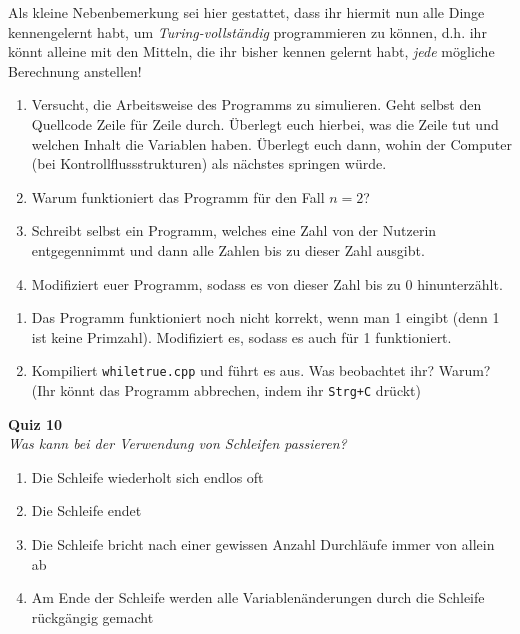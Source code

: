 Als kleine Nebenbemerkung sei hier gestattet, dass ihr hiermit nun alle Dinge
kennengelernt habt, um \emph{Turing-vollständig} programmieren zu können, d.h.
ihr könnt alleine mit den Mitteln, die ihr bisher kennen gelernt habt,
\emph{jede} mögliche Berechnung anstellen!

\begin{praxis}
      \begin{enumerate}
            \item Versucht, die Arbeitsweise des Programms zu simulieren. Geht selbst
                  den Quellcode Zeile für Zeile durch. Überlegt euch hierbei, was die Zeile tut
                  und welchen Inhalt die Variablen haben. Überlegt euch dann, wohin der
                  Computer (bei Kontrollflussstrukturen) als nächstes springen würde.
            \item Warum funktioniert das Programm für den Fall $n = 2$?
            \item Schreibt selbst ein Programm, welches eine Zahl von der Nutzerin
                  entgegennimmt und dann alle Zahlen bis zu dieser Zahl ausgibt.
            \item Modifiziert euer Programm, sodass es von dieser Zahl bis zu 0
                  hinunterzählt.
      \end{enumerate}
\end{praxis}

\begin{spiel}
      \begin{enumerate}
            \item Das Programm funktioniert noch nicht korrekt, wenn man 1 eingibt
                  (denn 1 ist keine Primzahl). Modifiziert es, sodass es auch für 1
                  funktioniert.
            \item Kompiliert \texttt{whiletrue.cpp} und führt es aus. Was beobachtet
                  ihr? Warum? (Ihr könnt das Programm abbrechen, indem ihr
                  \texttt{Strg+C} drückt)
      \end{enumerate}
      

\end{spiel}

\textbf{Quiz 10}\\
\textit{Was kann bei der Verwendung von Schleifen passieren?}
\begin{enumerate}[label=\alph*)]
    \item Die Schleife wiederholt sich endlos oft
    \item Die Schleife endet
    \item Die Schleife bricht nach einer gewissen Anzahl Durchläufe immer von allein ab
    \item Am Ende der Schleife werden alle Variablenänderungen durch die Schleife rückgängig gemacht
\end{enumerate}
